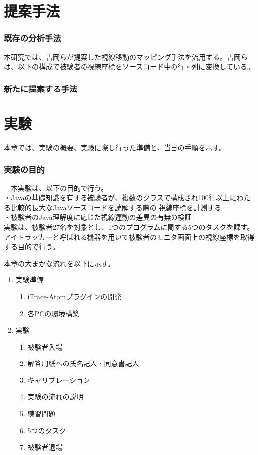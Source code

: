 \documentclass[paper=a4paper,fontsize=10pt]{jlreq}
\begin{document}
\clearpage

\part{提案手法}
  \section{既存の分析手法}
  本研究では、吉岡らが提案した視線移動のマッピング手法を流用する。吉岡らは、以下の構成で被験者の視線座標をソースコード中の行・列に変換している。\\


  \section{新たに提案する手法}

\clearpage

\part{実験}
  本章では、実験の概要、実験に際し行った準備と、当日の手順を示す。\\

  \section{実験の目的}
  　本実験は、以下の目的で行う。\\
  ・Javaの基礎知識を有する被験者が、複数のクラスで構成され100行以上にわたる比較的長大なJavaソースコードを読解する際の
  視線座標を計測する\\
  ・被験者のJava理解度に応じた視線運動の差異の有無の検証\\


  実験は、被験者27名を対象とし、1つのプログラムに関する5つのタスクを課す。
  アイトラッカーと呼ばれる機器を用いて被験者のモニタ画面上の視線座標を取得する目的で行う。
  
  本章の大まかな流れを以下に示す。
  \begin{enumerate}
    \item 実験準備
      \begin{enumerate}
        \item iTrace-Atomプラグインの開発
        \item 各PCの環境構築
      \end{enumerate}
    \item 実験
      \begin{enumerate}
        \item 被験者入場
        \item 解答用紙への氏名記入・同意書記入
        \item キャリブレーション
        \item 実験の流れの説明
        \item 練習問題
        \item 5つのタスク
        \item 被験者退場
      \end{enumerate}
  \end{enumerate}
\end{document}
